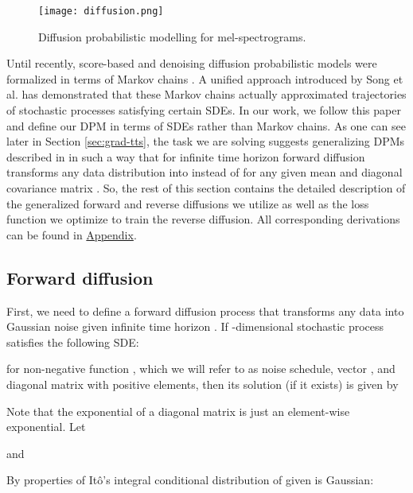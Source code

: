 \documentclass{article}
\begin{document}
\begin{figure}[ht]
\vskip 0.2in
\begin{center}
\centerline{\texttt{[image: diffusion.png]}}
\caption{Diffusion probabilistic modelling for mel-spectrograms.}
\label{fig:diffusion}
\end{center}
\vskip -0.2in
\end{figure}

Until recently, score-based and denoising diffusion probabilistic models were formalized in terms of Markov chains \cite{DiffusionBasic, ScoreBasedGeneration, DDPM, ScoreBasedImproved}. A unified approach introduced by Song et al.  has demonstrated that these Markov chains actually approximated trajectories of stochastic processes satisfying certain SDEs. In our work, we follow this paper and define our DPM in terms of SDEs rather than Markov chains. As one can see later in Section \ref{sec:grad-tts}, the task we are solving suggests generalizing DPMs described in \cite{SDE-main} in such a way that for infinite time horizon forward diffusion transforms any data distribution into  instead of  for any given mean  and diagonal covariance matrix . So, the rest of this section contains the detailed description of the generalized forward and reverse diffusions we utilize as well as the loss function we optimize to train the reverse diffusion. All corresponding derivations can be found in \hyperref[sec:appendix]{Appendix}.

\subsection{Forward diffusion}
\label{subsec:fwd_diffusion}

First, we need to define a forward diffusion process that transforms any data into Gaussian noise given infinite time horizon . If -dimensional stochastic process  satisfies the following SDE:



for non-negative function , which we will refer to as noise schedule, vector , and diagonal matrix  with positive elements, then its solution (if it exists) is given by 



Note that the exponential of a diagonal matrix is just an element-wise exponential. Let



and 



By properties of It\^o's integral conditional distribution of  given  is Gaussian:
\end{document}
